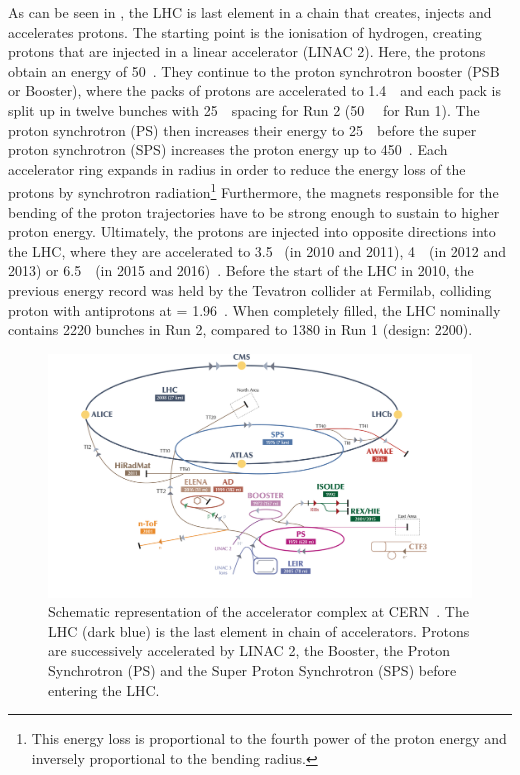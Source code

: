  As can be seen in , the LHC is last element in a chain that creates, injects and accelerates protons. The starting point is the ionisation of hydrogen, creating protons that are injected in a linear accelerator (LINAC 2). Here, the protons obtain an energy of 50~\MeV. They continue to the proton synchrotron booster (PSB or Booster), where the packs of protons are accelerated to 1.4~\GeV\ and each pack is split up in twelve bunches with 25~\nano\s\ spacing for Run 2 (50~\nano\s
 \ for Run 1). The proton synchrotron (PS) then increases their energy to 25~\GeV\ before the super proton synchrotron (SPS) increases the proton energy up to 450~\GeV. Each accelerator ring expands in radius in order to reduce the energy loss of the protons by synchrotron radiation\footnote{This energy loss is proportional to the fourth power of the proton energy and inversely proportional to the bending radius.} Furthermore, the magnets responsible for the bending of the proton trajectories have to be strong enough to sustain to higher proton energy. Ultimately, the protons are injected into opposite directions into the LHC, where they are accelerated to 3.5 \TeV\ (in 2010 and 2011), 4~\TeV\ (in 2012 and 2013) or 6.5~\TeV\ (in 2015 and 2016)~\cite{Wenninger:2254678}. Before the start of the LHC in 2010, the previous energy record was held by the Tevatron collider at Fermilab, colliding proton with antiprotons at \com = 1.96~\TeV.  When completely filled, the LHC nominally contains 2220 bunches in Run 2, compared to 1380 in Run 1 (design: 2200). 
 \begin{figure}[h]
 	\centering
 	\includegraphics[width=1.\textwidth]{2_ExperimentalSetup/Figures/CCC-v2016}
 	\caption{Schematic representation of the accelerator complex at CERN~\cite{DeMelis:2197559}. The LHC (dark blue) is the last element in chain of accelerators. Protons are successively accelerated by LINAC 2, the Booster, the Proton Synchrotron (PS) and the Super Proton Synchrotron (SPS) before entering the LHC.}
 	\label{fig:LHCchain}
 \end{figure}

